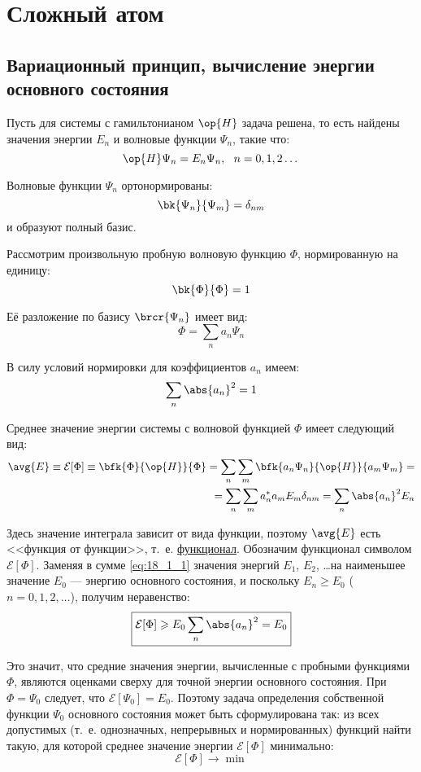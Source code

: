 \chapter{Сложный атом}

\section{Вариационный принцип, вычисление энергии основного состояния}

Пусть для системы с гамильтонианом $\op{H}$ задача решена, то есть найдены значения энергии $E_n$ и волновые функции $\Psi_n$, такие что:
$$
\op{H}\Psi_n = E_n \Psi_n,~~ n = 0,1,2 \dots
$$

Волновые функции $\Psi_n$ ортонормированы:
$$
\bk{\Psi_n}{\Psi_m} = \delta_{nm}
$$
и образуют полный базис.

Рассмотрим произвольную пробную волновую функцию $\Phi$, нормированную на единицу:
$$
\bk{\Phi}{\Phi} = 1
$$

Её разложение по базису $\brcr{\Psi_n}$ имеет вид:
$$
\Phi = \sum_n a_n \Psi_n
$$

В силу условий нормировки для коэффициентов $a_n$ имеем:
$$
\sum_n \abs{a_n}^2 = 1
$$

Среднее значение энергии системы с волновой функцией $\Phi$ имеет следующий вид:
\begin{eqnarray}
\label{eq:18_1_1}
\avg{E} \equiv \mathcal{E}[\Phi] \equiv \bfk{\Phi}{\op{H}}{\Phi}  = \sum_n \sum_m \bfk{a_n \Psi_n}{\op{H}}{a_m \Psi_m} = \nonumber \\ = \sum_n \sum_m a_n^* a_m E_m \delta_{nm} = \sum_n \abs{a_n}^2 E_n
\end{eqnarray}

Здесь значение интеграла зависит от вида функции, поэтому $\avg{E}$ есть <<функция от функции>>, т.~е. \underline{функционал}. Обозначим функционал символом $\mathcal{E}[\Phi]$. Заменяя в сумме \eqref{eq:18_1_1} значения энергий $E_1$, $E_2$, \dots на наименьшее значение $E_0$ --- энергию основного состояния, и поскольку  $E_n \geqslant E_0$ ($n=0, 1, 2, \dots$), получим неравенство:
\begin{equation}
\label{eq:18_1_2}
\boxed{\mathcal{E}[\Phi] \geqslant E_0 \sum_n \abs{a_n}^2 = E_0}
\end{equation}

Это значит, что средние значения энергии, вычисленные с пробными функциями $\Phi$, являются оценками сверху для точной энергии основного состояния. При $\Phi = \Psi_0$ следует, что $\mathcal{E}[\Psi_0] = E_0$.
Поэтому задача определения собственной функции $\Psi_0$ основного состояния может быть сформулирована так: из всех допустимых (т.~е. однозначных, непрерывных и нормированных) функций найти такую, для которой среднее значение энергии $\mathcal{E}[\Phi]$ минимально:
\begin{equation}
\label{eq:18_1_3}
\mathcal{E}[\Phi] \to \min
\end{equation}

